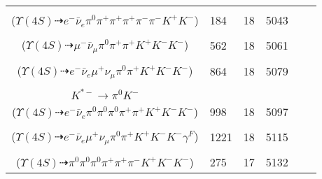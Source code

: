 \documentclass[landscape]{article}
\newcounter{rownumbers}
\newcommand\rn{\stepcounter{rownumbers}\arabic{rownumbers}}
\newcommand{\EOL}{\\} %
\newcommand{\topoTags}[1]{#1} %
\begin{document}
\begin{longtable}{clcccc}
\rn & \makecell[l]{ $ 
\Upsilon(4S) \rightarrow B^{0} \bar{B}^{0} ,
B^{0} \rightarrow \pi^{0} K^{+} K^{-} ,
\bar{B}^{0} \rightarrow e^{-} \bar{\nu}_{e} D^{*+} ,
D^{*+} \rightarrow \pi^{+} D^{0} ,
D^{0} \rightarrow \pi^{+} \pi^{-} K_{S}^{0} ,
K_{S}^{0} \rightarrow \pi^{+} \pi^{-} 
$ \\ ($
\Upsilon(4S) \dashrightarrow e^{-} \bar{\nu}_{e} \pi^{0} \pi^{+} \pi^{+} \pi^{+} \pi^{-} \pi^{-} K^{+} K^{-} 
$) } & \topoTags{184 & }18 & 5043 \EOL

\rn & \makecell[l]{ $ 
\Upsilon(4S) \rightarrow B^{0} \bar{B}^{0} ,
B^{0} \rightarrow \pi^{0} K^{+} K^{-} ,
\bar{B}^{0} \rightarrow \mu^{-} \bar{\nu}_{\mu} D^{*+} ,
D^{*+} \rightarrow \pi^{+} D^{0} ,
D^{0} \rightarrow \pi^{+} K^{-} 
$ \\ ($
\Upsilon(4S) \dashrightarrow \mu^{-} \bar{\nu}_{\mu} \pi^{0} \pi^{+} \pi^{+} K^{+} K^{-} K^{-} 
$) } & \topoTags{562 & }18 & 5061 \EOL

\rn & \makecell[l]{ $ 
\Upsilon(4S) \rightarrow B^{0} \bar{B}^{0} ,
B^{0} \rightarrow \pi^{0} K^{+} K^{-} ,
\bar{B}^{0} \rightarrow e^{-} \bar{\nu}_{e} D^{*+} ,
D^{*+} \rightarrow \pi^{+} D^{0} ,
D^{0} \rightarrow \mu^{+} \nu_{\mu} K^{-} 
$ \\ ($
\Upsilon(4S) \dashrightarrow e^{-} \bar{\nu}_{e} \mu^{+} \nu_{\mu} \pi^{0} \pi^{+} K^{+} K^{-} K^{-} 
$) } & \topoTags{864 & }18 & 5079 \EOL

\rn & \makecell[l]{ $ 
\Upsilon(4S) \rightarrow B^{0} \bar{B}^{0} ,
B^{0} \rightarrow \pi^{0} K^{+} K^{-} ,
\bar{B}^{0} \rightarrow e^{-} \bar{\nu}_{e} D^{*+} ,
D^{*+} \rightarrow \pi^{+} D^{0} ,
D^{0} \rightarrow \rho^{+} K^{*-} ,
\rho^{+} \rightarrow \pi^{0} \pi^{+} ,
$ \\ $
K^{*-} \rightarrow \pi^{0} K^{-} 
$ \\ ($
\Upsilon(4S) \dashrightarrow e^{-} \bar{\nu}_{e} \pi^{0} \pi^{0} \pi^{0} \pi^{+} \pi^{+} K^{+} K^{-} K^{-} 
$) } & \topoTags{998 & }18 & 5097 \EOL

\rn & \makecell[l]{ $ 
\Upsilon(4S) \rightarrow B^{0} \bar{B}^{0} ,
B^{0} \rightarrow \pi^{0} K^{+} K^{-} ,
\bar{B}^{0} \rightarrow e^{-} \bar{\nu}_{e} D^{*+} \gamma^{F} ,
D^{*+} \rightarrow \pi^{+} D^{0} ,
D^{0} \rightarrow \mu^{+} \nu_{\mu} K^{-} 
$ \\ ($
\Upsilon(4S) \dashrightarrow e^{-} \bar{\nu}_{e} \mu^{+} \nu_{\mu} \pi^{0} \pi^{+} K^{+} K^{-} K^{-} \gamma^{F} 
$) } & \topoTags{1221 & }18 & 5115 \EOL

\rn & \makecell[l]{ $ 
\Upsilon(4S) \rightarrow B^{0} \bar{B}^{0} ,
B^{0} \rightarrow \pi^{0} K^{+} K^{-} ,
\bar{B}^{0} \rightarrow \pi^{0} \pi^{-} D^{*+} ,
D^{*+} \rightarrow \pi^{+} D^{0} ,
D^{0} \rightarrow \pi^{0} \pi^{+} K^{-} 
$ \\ ($
\Upsilon(4S) \dashrightarrow \pi^{0} \pi^{0} \pi^{0} \pi^{+} \pi^{+} \pi^{-} K^{+} K^{-} K^{-} 
$) } & \topoTags{275 & }17 & 5132 \EOL


\end{longtable}
\end{document}
